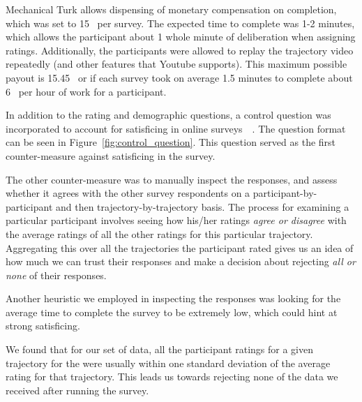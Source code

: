 \documentclass[letterpaper, 10 pt, conference]{ieeeconf}  %
\begin{document}
Mechanical Turk allows dispensing of monetary compensation on completion, which was set to 15\textcent~ per survey. The expected time to complete was 1-2 minutes, which allows the participant about 1 whole minute of deliberation when assigning ratings. Additionally, the participants were allowed to replay the trajectory video repeatedly (and other features that Youtube supports). This maximum possible payout is 15.45\textdollar~ or if each survey took on average 1.5 minutes to complete about 6\textdollar~ per hour of work for a participant.


In addition to the rating and demographic questions, a control question was incorporated to account for satisficing in online surveys~\cite{krosnick1991response}~\cite{krosnick1996satisficing}. The question format can be seen in Figure~\ref{fig:control_question}. This question served as the first counter-measure against satisficing in the survey. 

The other counter-measure was to manually inspect the responses, and assess whether it agrees with the other survey respondents on a participant-by-participant and then trajectory-by-trajectory basis. The process for examining a particular participant involves seeing how his/her ratings {\em agree or disagree} with the average ratings of all the other ratings for this particular trajectory. Aggregating this over all the trajectories the participant rated gives us an idea of how much we can trust their responses and make a decision about rejecting {\em all or none} of their responses. 

Another heuristic we employed in inspecting the responses was looking for the average time to complete the survey to be extremely low, which could hint at strong satisficing.

We found that for our set of data, all the participant ratings for a given trajectory for the were usually within one standard deviation of the average rating for that trajectory. This leads us towards rejecting none of the data we received after running the survey.
\end{document}
